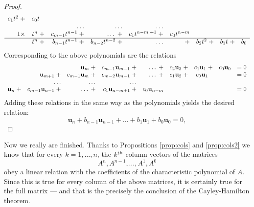 \documentclass[12pt]{article}
\newcommand{\vu}{\mathbf{u}}
\begin{document}
\begin{proof}
{$$\begin{array}{rrrrrrrrrr}
c_1 t^2 \;+& 
c_0t\hphantom{+}\\
&& \ldots & \ldots & \ldots \\
1\times&t^{n} \;+& c_{m-1}t^{n-1} \;+& \ldots \;+&  c_1 t^{n-m\;+1} \;+&
c_0t^{n-m} \\
\hline
& t^n \;+& b_{n-1} t^{n-1} \;+& b_{n-2} t^{n-2} \;+ & \ldots & +  &
b_2 t^2 \; + & b_1 t \;+& b_0  
\end{array}
$$
}
Corresponding to the above polynomials are  the relations
{\small
$$
\begin{array}{rrrrrrrrrr}
&& \vu_{m} \;+& c_{m-1}\vu_{m-1} \;+& \ldots \;+& c_2 \vu_2 \;+&  c_1 \vu_1
\;+& c_0\vu_0 &=0\\
& \vu_{m+1} \;+& c_{m-1}\vu_{m} \;+& c_{m-2}\vu_{m-1} \;+&
\ldots \;+&  c_1 \vu_2
\;+& c_0\vu_1\hphantom{+} &&=0\\
& \ldots & \ldots & \ldots \\
\vu_{n} \;+& c_{m-1}\vu_{n-1}  \;+&
\ldots \;+&  c_1 \vu_{n-m+1}
\;+& c_0\vu_{n-m} &&&&=0\\
\end{array}
$$
} Adding these relations in the same way as the polynomials yields
the desired relation:
 $$\vu_n+b_{n-1}\vu_{n-1} + \ldots + b_1 \vu_1 + b_0\vu_0=0,$$
\end{proof}

Now we really are finished.  Thanks to Propositions \ref{prop:cols}
and \ref{prop:cols2} we know that for every $k=1,\ldots, n$, the $k^{\rm
  th}$ column vectors of the matrices 
$$A^n, A^{n-1}, \ldots, A^1, A^0$$
obey a linear relation with the coefficients of the characteristic
polynomial of $A$.  Since this is true for every column of the above
matrices, it is certainly true for the full matrix --- and that is the
precisely the conclusion of the Cayley-Hamilton theorem.
 

\end{document}
